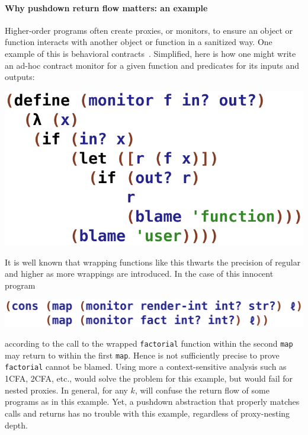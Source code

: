 \paragraph{Why pushdown return flow matters: an example}
Higher-order programs often create proxies, or monitors, to ensure an object or function interacts with another object or function in a sanitized way.
%
One example of this is behavioral contracts~\citep{dvanhorn:Findler2002Contracts}.
%
Simplified, here is how one might write an ad-hoc contract monitor for
a given function and predicates for its inputs and outputs:
 \begin{center}
  \includegraphics[scale=0.45]{monitor}
 \end{center}

It is well known that wrapping functions like this thwarts the
precision of regular \zcfa{} and higher \kcfa{} as more wrappings are
introduced.
%
In the case of this innocent program
 \begin{center}
  \includegraphics[scale=0.45]{pair}
 \end{center}

according to \zcfa{} the call to the wrapped \texttt{factorial}
function within the second \texttt{map} may return to within the
first \texttt{map}.  Hence \zcfa{} is not sufficiently precise to 
prove \texttt{factorial} cannot be blamed.
%
Using more a context-sensitive analysis such as 1CFA, 2CFA, etc.,
would solve the problem for this example, but would fail for nested
proxies.
%
In general, for any $k$, \kcfa{} will confuse the return flow of some
programs as in this example.
%
Yet, a pushdown abstraction that properly matches calls and returns
has no trouble with this example, regardless of proxy-nesting depth.


